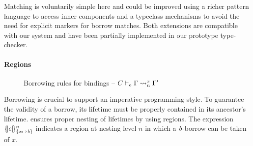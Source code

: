 Matching is voluntarily simple here and
could be improved using a richer pattern language
to access inner components and a typeclass mechanisms
to avoid the need for explicit markers for borrow matches.
Both extensions are compatible with our system and have been partially
implemented in our prototype type-checker.

\paragraph{Regions}
\label{sdtyping:regions}

\begin{figure}[tp]
    \centering


    \begin{mathpar}
    \end{mathpar}
    \vspace{-10pt}
    \caption{Borrowing rules for bindings -- $\lregion{C}{x}{\E}{\E'}$}
    \label{env:rule:borrow}
  \vspace{-10pt}
\end{figure}

Borrowing is crucial to support an imperative programming style.
To guarantee the validity of a borrow, its lifetime must be properly contained in its
ancestor's lifetime. \lang ensures proper nesting of lifetimes by using
regions. The expression $\region{\Sone x\BORROW}{e}$ indicates a
region at nesting level $n$ in which a $\BORROW$-borrow can be taken of $x$.

